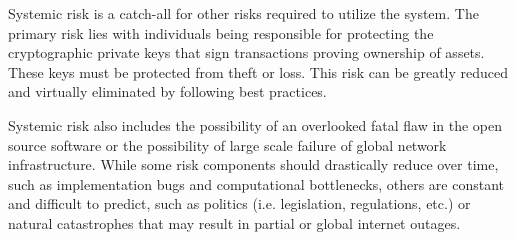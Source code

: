 Systemic risk is a catch-all for other risks required to utilize the system.
The primary risk lies with individuals being responsible for protecting the
cryptographic private keys that sign transactions proving ownership of assets.
These keys must be protected from theft or loss. This risk can be greatly
reduced and virtually eliminated by following best practices.


Systemic risk also includes the possibility of an overlooked fatal flaw in the
open source software or the possibility of large scale failure of global
network infrastructure. While some risk components should drastically reduce
over time, such as implementation bugs and computational bottlenecks, others
are constant and difficult to predict, such as politics (i.e. legislation,
regulations, etc.) or natural catastrophes that may result in partial or global
internet outages.
